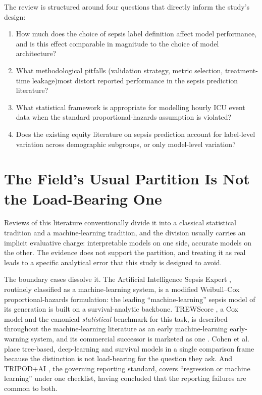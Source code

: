 The review is structured around four questions that directly inform the
study's design:

\begin{enumerate}
    \item[\textbf{RQ1.}] How much does the choice of sepsis label definition
    affect model performance, and is this effect comparable in magnitude to
    the choice of model architecture?
    \item[\textbf{RQ2.}] What methodological pitfalls (validation strategy,
    metric selection, treatment-time leakage)most distort reported
    performance in the sepsis prediction literature?
    \item[\textbf{RQ3.}] What statistical framework is appropriate for
    modelling hourly ICU event data when the standard proportional-hazards
    assumption is violated?
    \item[\textbf{RQ4.}] Does the existing equity literature on sepsis
    prediction account for label-level variation across demographic subgroups,
    or only model-level variation?
\end{enumerate}


\section{The Field's Usual Partition Is Not the Load-Bearing One}
\label{sec:false_dichotomy}

Reviews of this literature conventionally divide it into a classical
statistical tradition and a machine-learning tradition, and the division
usually carries an implicit evaluative charge: interpretable models on one
side, accurate models on the other. The evidence does not support the
partition, and treating it as real leads to a specific analytical error that
this study is designed to avoid.

The boundary cases dissolve it. The Artificial Intelligence Sepsis Expert
\cite{nemati2018aise}, routinely classified as a machine-learning system, is a
modified Weibull--Cox proportional-hazards formulation: the leading
``machine-learning'' sepsis model of its generation is built on a
survival-analytic backbone. TREWScore \cite{henry2015trewscore}, a Cox model
and the canonical \emph{statistical} benchmark for this task, is described
throughout the machine-learning literature as an early machine-learning
early-warning system, and its commercial successor is marketed as one
\cite{adams2022trews}. Cohen et al.\ \cite{cohen2024subtle} place tree-based,
deep-learning and survival models in a single comparison frame because the
distinction is not load-bearing for the question they ask. And TRIPOD+AI
\cite{collins2024tripodai}, the governing reporting standard, covers
``regression or machine learning'' under one checklist, having concluded that
the reporting failures are common to both.

